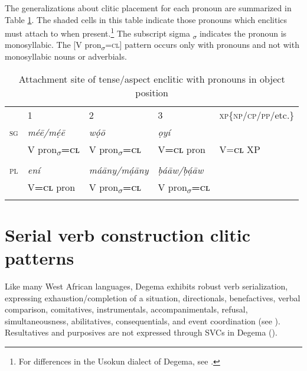 \documentclass[output=paper]{langsci/langscibook}
\begin{document}
The generalizations about clitic placement for each pronoun are summarized in Table \ref{table:2}. The shaded cells in this table indicate those pronouns which enclitics must attach to when present.\footnote{For differences in the Usokun dialect of Degema, see \citet{Offah2000}.} 
The subscript sigma \textsubscript{$\sigma $} indicates the pronoun is monosyllabic. The [V pron\textsubscript{$\sigma $}=\textsc{cl}] pattern occurs only with pronouns and not with monosyllabic nouns or adverbials.

\begin{table}
\caption{Attachment site of tense/aspect enclitic with pronouns in object position}
\label{table:2}

\begin{tabularx}{\textwidth}{XXXXX}
& {1} & {2} & {3} & {\textsc{xp\{np/cp/pp/}etc.\}}\\
\lsptoprule
{\scshape sg} & {\itshape méē/mẹ́ē} 
		  & {\itshape wọ́ō} 
		      & {\itshape ọyí} 
			  & { }\\
	      & {V pron\textsubscript{$\sigma $}\textbf{\textsc{=cl}}} 
		  & {V pron\textsubscript{$\sigma $}\textbf{=\textsc{cl}}} 
		      & {V\textbf{=}\textbf{\textsc{cl}} pron} 
			  & {V=\textbf{\textsc{cl}} XP}\\
	      \\
{\scshape pl} & {\itshape ení}  
		  & {\itshape máāny/mạ́āny} 
		      & {\itshape ḅáāw/ḅạ́āw} 
			  & { } \\
	      &  {V\textbf{=\textsc{cl}} pron} 
		  & {V pron\textsubscript{$\sigma $}\textbf{=\textsc{cl}}} 
          & {V pron\textsubscript{$\sigma $}\textbf{=\textsc{cl}}} 
		      & { } \\
\lspbottomrule
\end{tabularx}
\end{table}

\section{Serial verb construction clitic patterns}

Like many West African languages, Degema exhibits robust verb serialization, expressing exhaustion/completion of a situation, directionals, benefactives, verbal comparison, comitatives, instrumentals, accompanimentals, refusal, simultaneousness, abilitatives, consequentials, and event coordination (see \citealt{Kari2003a}). Resultatives and purposives are not expressed through SVCs in Degema (\citealt[59--60, 206]{Kari2004}).
\end{document}
